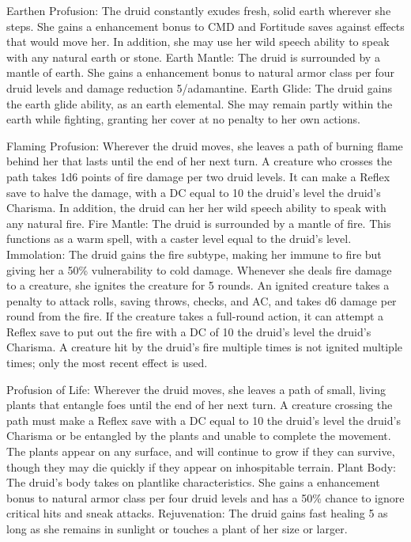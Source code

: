 \begin{greaterwildaspect}
\wilditem Earthen Profusion: The druid constantly exudes fresh, solid earth wherever she steps. She gains a  enhancement bonus to CMD and Fortitude saves against effects that would move her. In addition, she may use her wild speech ability to speak with any natural earth or stone.
\wilditem Earth Mantle: The druid is surrounded by a mantle of earth. She gains a  enhancement bonus to natural armor class per four druid levels and damage reduction 5/adamantine.
\wilditemplus Earth Glide: The druid gains the earth glide ability, as an earth elemental. She may remain partly within the earth while fighting, granting her cover at no penalty to her own actions.
\end{greaterwildaspect}

\begin{greaterwildaspect}
\wilditem Flaming Profusion: Wherever the druid moves, she leaves a path of burning flame behind her that lasts until the end of her next turn. A creature who crosses the path takes 1d6 points of fire damage per two druid levels. It can make a Reflex save to halve the damage, with a DC equal to 10 \add the druid's level \add the druid's Charisma. In addition, the druid can her her wild speech ability to speak with any natural fire.
\wilditem Fire Mantle: The druid is surrounded by a mantle of fire. This functions as a warm  spell, with a caster level equal to the druid's level.
\wilditemplus Immolation: The druid gains the fire subtype, making her immune to fire but giving her a 50\% vulnerability to cold damage. Whenever she deals fire damage to a creature, she ignites the creature for 5 rounds. An ignited creature takes a  penalty to attack rolls, saving throws, checks, and AC, and takes d6 damage per round from the fire. If the creature takes a full-round action, it can attempt a Reflex save to put out the fire with a DC of 10 \add the druid's level \add the druid's Charisma. A creature hit by the druid's fire multiple times is not ignited multiple times; only the most recent effect is used.
\end{greaterwildaspect}

\begin{greaterwildaspect}
\wilditem Profusion of Life: Wherever the druid moves, she leaves a path of small, living plants that entangle foes until the end of her next turn. A creature crossing the path must make a Reflex save with a DC equal to 10 \add the druid's level \add the druid's Charisma or be entangled by the plants and unable to complete the movement. The plants appear on any surface, and will continue to grow if they can survive, though they may die quickly if they appear on inhospitable terrain.
\wilditem Plant Body: The druid's body takes on plantlike characteristics. She gains a  enhancement bonus to natural armor class per four druid levels and has a 50\% chance to ignore critical hits and sneak attacks.
\wilditemplus Rejuvenation: The druid gains fast healing 5 as long as she remains in sunlight or touches a plant of her size or larger.
\end{greaterwildaspect}

